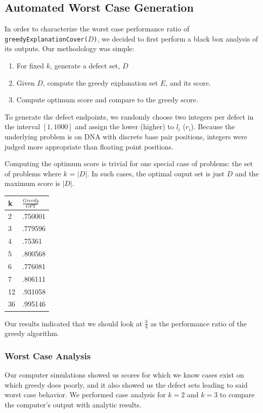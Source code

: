 \subsection{Automated Worst Case Generation}

In order to characterize the worst case performance ratio of \texttt{greedyExplanationCover($D$)}, we decided to first perform a black box analysis of its outputs.  Our methodology was simple: 

\begin{enumerate}
\item For fixed $k$, generate a defect set, $D$
\item Given $D$, compute the greedy explanation set $E$, and its score.
\item Compute optimum score and compare to the greedy score.
\end{enumerate}

To generate the defect endpoints, we randomly choose two integers per defect in the interval $[1,1000]$ and assign the lower (higher) to $l_i$ ($r_i$).  Because the underlying problem is on DNA with discrete base pair positions, integers were judged more appropriate than floating point positions.

Computing the optimum score is trivial for one special case of problems: the set of problems where $k$ = $|D|$.  In such cases, the optimal ouput set is just $D$ and the maximum score is $|D|$.  

\begin{tabular}{l|l}
k & $\frac{Greedy}{OPT}$ \\ \hline
 2 & .750001  \\
 3 & .779596  \\
 4 & .75361   \\
 5 & .800568  \\
 6 & .776081  \\
 7 & .806111  \\
12 & .931058  \\
36 & .995146  \\
\end{tabular}

Our results indicated that we should look at $\frac34$ as the performance ratio of the greedy algorithm.

\subsubsection{Worst Case Analysis}

Our computer simulations showed us scores for which we know cases exist on which greedy does poorly, and it also showed us the defect sets leading to said worst case behavior.  We performed case analysis for $k=2$ and $k=3$ to compare the computer's output with analytic results.

